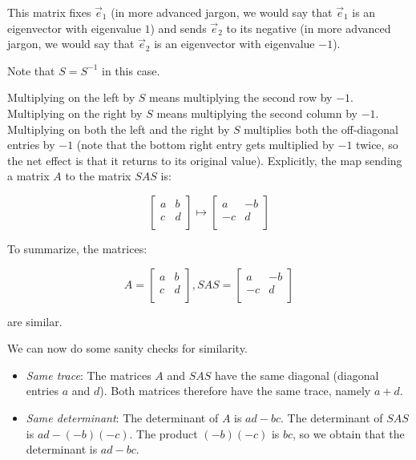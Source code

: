 \documentclass[10pt]{amsart}
\begin{document}
This matrix fixes $\vec{e}_1$ (in more advanced jargon, we would say
that $\vec{e}_1$ is an eigenvector with eigenvalue $1$) and sends
$\vec{e}_2$ to its negative (in more advanced jargon, we would say
that $\vec{e}_2$ is an eigenvector with eigenvalue $-1$).

Note that $S = S^{-1}$ in this case.

Multiplying on the left by $S$ means multiplying the second row by
$-1$. Multiplying on the right by $S$ means multiplying the second
column by $-1$. Multiplying on both the left and the right by $S$
multiplies both the off-diagonal entries by $-1$ (note that the bottom
right entry gets multiplied by $-1$ twice, so the net effect is that
it returns to its original value). Explicitly, the map sending a
matrix $A$ to the matrix $SAS$ is:

$$\left[\begin{matrix} a & b \\ c & d \\\end{matrix}\right] \mapsto \left[\begin{matrix} a & -b \\ -c & d \\\end{matrix}\right]$$

To summarize, the matrices:

$$A = \left[\begin{matrix} a & b \\ c & d \\\end{matrix}\right], SAS = \left[\begin{matrix} a & -b \\ -c & d \\\end{matrix}\right]$$

are similar.

We can now do some sanity checks for similarity.

\begin{itemize}
\item {\em Same trace}: The matrices $A$ and $SAS$ have the same
  diagonal (diagonal entries $a$ and $d$). Both matrices therefore
  have the same trace, namely $a + d$.
\item {\em Same determinant}: The determinant of $A$ is $ad - bc$. The
  determinant of $SAS$ is $ad - (-b)(-c)$. The product $(-b)(-c)$ is
  $bc$, so we obtain that the determinant is $ad - bc$.
\end{itemize}
\end{document}
